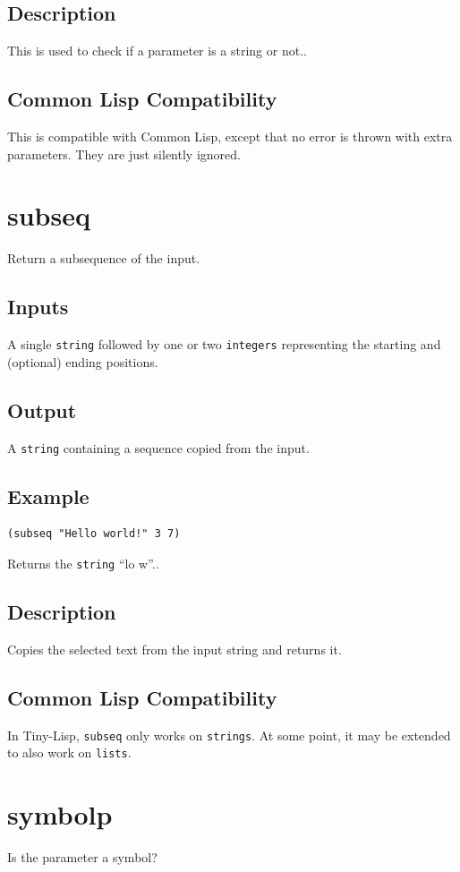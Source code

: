 \documentclass[10pt, openany]{book}
\newcommand{\keyword}[1]{\texttt{#1}}
\newcommand{\datatype}[1]{\texttt{#1}}
\newcommand{\tl}{Tiny-Lisp}
\newcommand{\cl}{Common Lisp}
\begin{document}
\subsection{Description}
This is used to check if a parameter is a string or not..
\subsection{Common Lisp Compatibility}
This is compatible with \cl, except that no error is thrown with extra parameters.  They are just silently ignored.

\section{subseq}
Return a subsequence of the input.
\subsection{Inputs}
A single \datatype{string} followed by one or two \datatype{integers} representing the starting and (optional) ending positions.
\subsection{Output}
A \datatype{string} containing a sequence copied from the input.
\subsection{Example}
\begin{lstlisting}
(subseq "Hello world!" 3 7)
\end{lstlisting}
Returns the \datatype{string} ``lo w''..
\subsection{Description}
Copies the selected text from the input string and returns it.
\subsection{Common Lisp Compatibility}
In \tl, \keyword{subseq} only works on \datatype{strings}.  At some point, it may be extended to also work on \datatype{lists}.

\section{symbolp}
Is the parameter a symbol?
\end{document}
